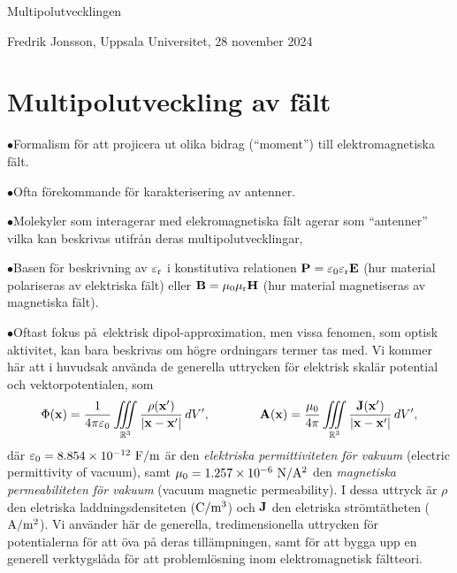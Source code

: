 \centerline{\twelvesc Multipolutvecklingen}
\centerline{Fredrik Jonsson, Uppsala Universitet, 28 november 2024}
\vskip24pt
\section{Multipolutveckling av f\"alt}
\item{$\bullet$}{Formalism f{\"o}r att projicera ut olika bidrag (``moment'')
   till elektromagnetiska f{\"a}lt.} 
\item{$\bullet$}{Ofta f{\"o}rekommande f{\"o}r karakterisering av antenner.}
\item{$\bullet$}{Molekyler som interagerar med elekromagnetiska f{\"a}lt agerar
   som ``antenner'' vilka kan beskrivas utifr{\aa}n deras multipolutvecklingar,}
\item{$\bullet$}{Basen f\"or beskrivning av $\varepsilon_{\rm r}$ i konstitutiva
   relationen ${\bf P}=\varepsilon_0\varepsilon_{\rm r}{\bf E}$ (hur material
   polariseras av elektriska f\"alt) eller ${\bf B}=\mu_0\mu_{\rm r}{\bf H}$
   (hur material magnetiseras av magnetiska f{\"a}lt).}
\item{$\bullet$}{Oftast fokus p\aa\ elektrisk dipol-approximation, men vissa
   fenomen, som optisk aktivitet, kan bara beskrivas om h{\"o}gre ordningars
   termer tas med.}
\medskip
\noindent
Vi kommer h{\"a}r att i huvudsak anv{\"a}nda de generella uttrycken f{\"o}r
elektrisk skal{\"a}r potential och vektorpotentialen,
som
$$
  \Phi({\bf x})={{1}\over{4\pi\varepsilon_0}}
    \iiint_{{\Bbb R}^3}{{\rho({\bf x}')}\over{|{\bf x}-{\bf x}'|}}\,dV',
    \qquad\qquad
  {\bf A}({\bf x})={{\mu_0}\over{4\pi}}
    \iiint_{{\Bbb R}^3}{{{\bf J}({\bf x}')}\over{|{\bf x}-{\bf x}'|}}\,dV',
$$
d{\"a}r $\varepsilon_0= 8.854\times10^{-12}\ {\rm F}/{\rm m}$ {\"a}r den
{\it elektriska permittiviteten f{\"o}r vakuum} (electric permittivity of
vacuum), samt $\mu_0=1.257\times10^{-6}\ {\rm N}/{\rm A}^2$ den {\it magnetiska
permeabiliteten f{\"o}r vakuum} (vacuum magnetic permeability). I dessa uttryck
{\"a}r $\rho$ den eletriska laddningsdensiteten (${\rm C}/{\rm m}^3$) och
${\bf J}$ den eletriska str{\"o}mt{\"a}theten (${\rm A}/{\rm m}^2$).
Vi anv{\"a}nder h{\"a}r de generella, tredimensionella uttrycken f{\"o}r
potentialerna f{\"o}r att {\"o}va p{\aa} deras till{\"a}mpningen, samt f{\"o}r
att bygga upp en generell verktygsl{\aa}da f{\"o}r att probleml{\"o}sning inom
elektromagnetisk f{\"a}ltteori.

